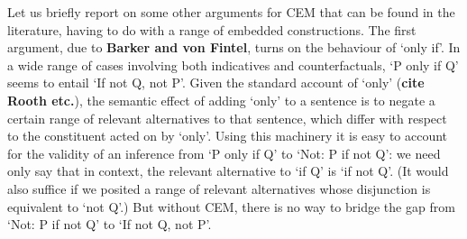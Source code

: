 \documentclass[leqno, 11pt, a5paper, openany]{article}
\begin{document}
Let us briefly report on some other arguments for CEM that can be found in the literature, having to do with a range of embedded constructions. The first argument, due to \textbf{Barker and von Fintel}, turns on the behaviour of ‘only if’. In a wide range of cases involving both indicatives and counterfactuals, ‘P only if Q’ seems to entail ‘If not Q, not P’. Given the standard account of ‘only’ (\textbf{cite Rooth etc.}), the semantic effect of adding ‘only’ to a sentence is to negate a certain range of relevant alternatives to that sentence, which differ with respect to the constituent acted on by ‘only’. Using this machinery it is easy to account for the validity of an inference from ‘P only if Q’ to ‘Not: P if not Q’: we need only say that in context, the relevant alternative to ‘if Q’ is ‘if not Q’. (It would also suffice if we posited a range of relevant alternatives whose disjunction is equivalent to ‘not Q’.) But without CEM, there is no way to bridge the gap from ‘Not: P if not Q’ to ‘If not Q, not P’.%
\end{document}
